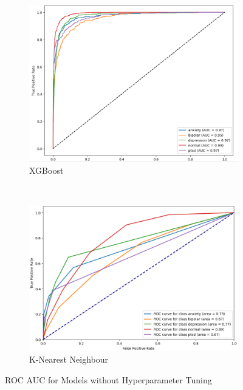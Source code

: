 \begin{figure}[H]
\begin{subfigure}[b]{0.49\textwidth}
        \includegraphics[width=\textwidth]{Images/XG ROC.png}
        \caption*{XGBoost}
        \label{XGROC}  %
    \end{subfigure}\
    \hfill
    \begin{subfigure}[b]{0.49\textwidth}
        \centering
        \includegraphics[width=\textwidth]{Images/KNN ROC.png}
        \caption*{K-Nearest Neighbour}
        \label{KNNROC}  %
    \end{subfigure}
    \label{fig:comparison}
    \caption*{ROC AUC for Models without Hyperparameter Tuning}
\end{figure}

\pagebreak

